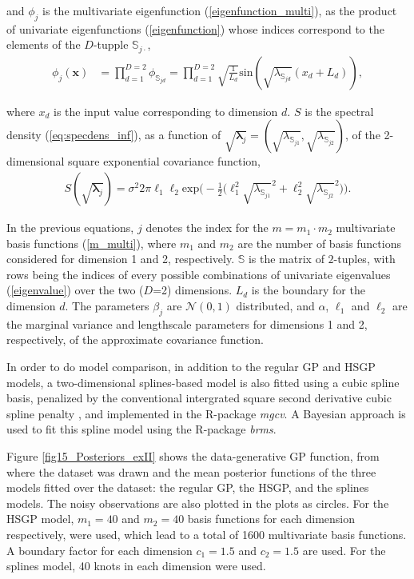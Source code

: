 \documentclass[]{interact}
\theoremstyle{plain}%
\theoremstyle{definition}
\theoremstyle{remark}
\begin{document}
\noindent and $\phi_j$ is the multivariate eigenfunction (\ref{eigenfunction_multi}), as the product of univariate eigenfunctions (\ref{eigenfunction}) whose indices correspond to the elements of the $D$-tupple $\mathbb{S}_{j\cdotp}$,
%
\begin{align*}
\phi_j(\bm{x}) &= \prod_{d=1}^{D=2} \phi_{\mathbb{S}_{jd}} = \prod_{d=1}^{D=2} \sqrt{\frac{1}{L_d}} \text{sin}\left(\sqrt{\lambda_{\mathbb{S}_{jd}}}(x_d+L_d)\right),
\end{align*}

\noindent where $x_d$ is the input value corresponding to dimension $d$. $S$ is the spectral density (\ref{eq:specdens_inf}), as a function of $\sqrt{\bm{\lambda}_j}= \left(\sqrt{\lambda_{\mathbb{S}_{j1}}},\sqrt{\lambda_{\mathbb{S}_{j2}}} \right)$, of the 2-dimensional square exponential covariance function,
%
\begin{eqnarray*}
S(\sqrt{\bm{\lambda}_j})= \sigma^2 2\pi \ell_1 \ell_2  \mathrm{exp}\Bigg(-\frac{1}{2} \bigg( \ell_1^2 \sqrt{\lambda_{\mathbb{S}_{j1}}}^2 + \ell_2^2 \sqrt{\lambda_{\mathbb{S}_{j2}}}^2 \bigg) \Bigg). 
\end{eqnarray*}

\noindent In the previous equations, $j$ denotes the index for the $m= m_1 \cdot m_2$ multivariate basis functions (\ref{m_multi}), where $m_1$ and $m_2$ are the number of basis functions considered for dimension 1 and 2, respectively. $\mathbb{S}$ is the matrix of $2$-tuples, with rows being the indices of every possible combinations of univariate eigenvalues (\ref{eigenvalue}) over the two ($D$=2) dimensions. $L_d$ is the boundary for the dimension $d$. The parameters $\beta_j$ are $\mathcal{N}(0,1)$ distributed, and $\alpha$, $\ell_1$ and $\ell_2$ are the marginal variance and lengthscale parameters for dimensions 1 and 2, respectively, of the approximate covariance function.

In order to do model comparison, in addition to the regular GP and HSGP models, a two-dimensional splines-based model is also fitted using a cubic spline basis, penalized by the conventional intergrated square second derivative cubic spline penalty \citep{wood2017generalized}, and implemented in the R-package \textit{mgcv}. A Bayesian approach is used to fit this spline model using the R-package \textit{brms}.

Figure \ref{fig15_Posteriors_exII} shows the data-generative GP function, from where the dataset was drawn and the mean posterior functions of the three models fitted over the dataset: the regular GP, the HSGP, and the splines models. The noisy observations are also plotted in the plots as circles. For the HSGP model, $m_1=40$ and $m_2=40$ basis functions for each dimension respectively, were used, which lead to a total of 1600 multivariate basis functions. A boundary factor for each dimension $c_1=1.5$ and $c_2=1.5$ are used. For the splines model, 40 knots in each dimension were used.
\end{document}

